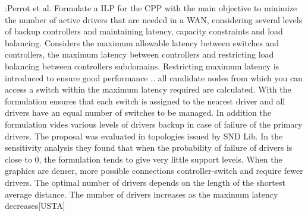 \documentclass[a4paper,10pt]{article}
\begin{document}
\cite{PeRe16}:Perrot et al. Formulate a ILP for the CPP with the main objective to minimize the number of active drivers that are needed in a WAN, considering several levels of backup controllers and maintaining latency, capacity constraints and load balancing. Considers the maximum allowable latency between switches and controllers, the maximum latency between controllers and restricting load balancing between controllers subdomains. Restricting maximum latency is introduced to ensure good performance .. all candidate nodes from which you can access a switch within the maximum latency required are calculated. With the formulation ensures that each switch is assigned to the nearest driver and all drivers have an equal number of switches to be managed. In addition the formulation vides various levels of drivers backup in case of failure of the primary drivers.
The proposal was evaluated in topologies issued by SND Lib. In the sensitivity analysis they found that when the probability of failure of drivers is close to 0, the formulation tends to give very little support levels. When the graphics are denser, more possible connections controller-switch and require fewer drivers. The optimal number of drivers depends on the length of the shortest average distance. The number of drivers increases as the maximum latency decreases[USTA]
\end{document}
